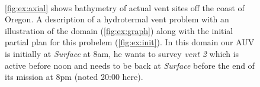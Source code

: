 \begin{figure}
  \centering
  \\
  \hfill {}
  \caption{\small{\ref{fig:ex:axial} shows bathymetry of actual vent
      sites off the coast of Oregon. A description of a hydrotermal
      vent problem with an illustration of the domain
      (\ref{fig:ex:graph}) along with the initial partial plan for
      this probelem (\ref{fig:ex:init}). In this domain our AUV is
      initially at {\em Surface} at 8am, he wants to survey {\em vent
        2} which is active before noon and needs to be back at {\em
        Surface} before the end of its mission at 8pm (noted 20:00
      here).}}
\label{fig:Example}
\end{figure}


